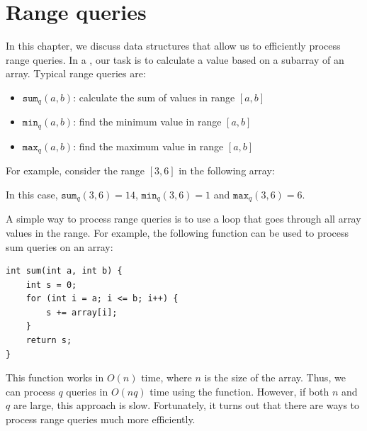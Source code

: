 \chapter{Range queries}


In this chapter, we discuss data structures
that allow us to efficiently process range queries.
In a ,
our task is to calculate a value
based on a subarray of an array.
Typical range queries are:
\begin{itemize}
\item $\texttt{sum}_q(a,b)$: calculate the sum of values in range $[a,b]$
\item $\texttt{min}_q(a,b)$: find the minimum value in range $[a,b]$
\item $\texttt{max}_q(a,b)$: find the maximum value in range $[a,b]$
\end{itemize}

For example, consider the range $[3,6]$ in the following array:
\begin{center}
\end{center}
In this case, $\texttt{sum}_q(3,6)=14$,
$\texttt{min}_q(3,6)=1$ and $\texttt{max}_q(3,6)=6$.

A simple way to process range queries is to use
a loop that goes through all array values in the range.
For example, the following function can be
used to process sum queries on an array:

\begin{lstlisting}
int sum(int a, int b) {
    int s = 0;
    for (int i = a; i <= b; i++) {
        s += array[i];
    }
    return s;
}
\end{lstlisting}

This function works in $O(n)$ time,
where $n$ is the size of the array.
Thus, we can process $q$ queries in $O(nq)$
time using the function.
However, if both $n$ and $q$ are large, this approach
is slow. Fortunately, it turns out that there are
ways to process range queries much more efficiently.

